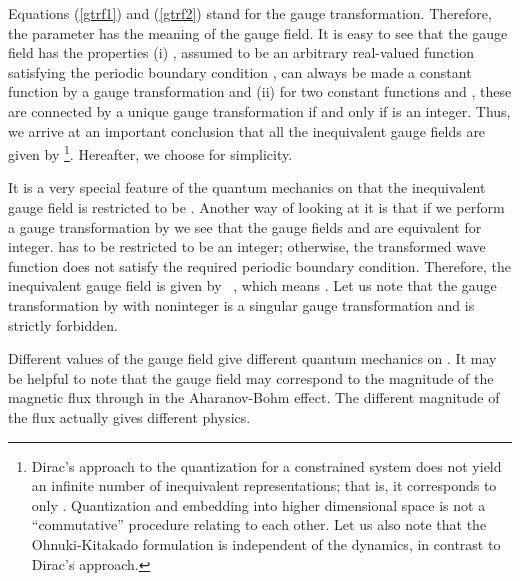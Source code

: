 \documentclass[a4paper,12pt]{article}
\begin{document}
Equations (\ref{gtrf1}) and (\ref{gtrf2}) stand for the gauge transformation.
Therefore, the parameter \myHighlight{$\alpha$}\coordHE{} has the meaning of the gauge field.
It is easy to see that the gauge field has 
the properties (i) \coordHE{}, assumed to be   
an arbitrary real-valued function satisfying the periodic boundary condition 
\coordHE{}, can always be made a constant 
function \coordHE{} by a gauge transformation and (ii) for 
two constant functions \coordHE{} 
and \coordHE{}, these are 
connected by a unique gauge transformation if and only if \myHighlight{$\beta-\alpha$}\coordHE{} is
an integer. Thus, we arrive at an important conclusion that 
all the inequivalent gauge fields are given by 
\coordHE{}\footnote{
Dirac's approach to the quantization for a constrained system does not
yield an infinite number of inequivalent representations; that is, it 
corresponds to only \coordHE{}. Quantization and 
embedding \coordHE{} into higher dimensional space \coordHE{} is 
not a ``commutative'' procedure relating to each other. Let us also note that 
the Ohnuki-Kitakado formulation is independent of the dynamics, in contrast to 
Dirac's approach.}.
Hereafter, we choose \coordHE{} for simplicity.
\par
It is a very special feature of the quantum mechanics on \coordHE{} that the 
inequivalent gauge field is restricted to be \coordHE{}. 
Another way of looking at it is that
if we perform a gauge transformation by
\coordHE{}
we see that the gauge fields \coordHE{} and \coordHE{} 
are equivalent for \coordHE{}integer. \coordHE{} has to be restricted to be 
an integer; otherwise, the transformed wave 
function \myHighlight{$\psi^{\prime}(\theta)$}\coordHE{} does not satisfy 
the required periodic boundary condition. 
Therefore, the inequivalent gauge field 
is given by \coordHE{}~, which means \coordHE{}. 
Let us note that the gauge transformation by \coordHE{} with
\coordHE{} noninteger is a singular gauge transformation and is strictly
forbidden. 
\par
Different values of the gauge field give different 
quantum mechanics on \coordHE{}. It may be helpful to note that the 
gauge field \myHighlight{$\alpha$}\coordHE{} may correspond to   
the magnitude of the magnetic flux \coordHE{} through \coordHE{} in 
the Aharanov-Bohm effect. The different magnitude of the flux 
actually gives different physics.   
\par
\end{document}
